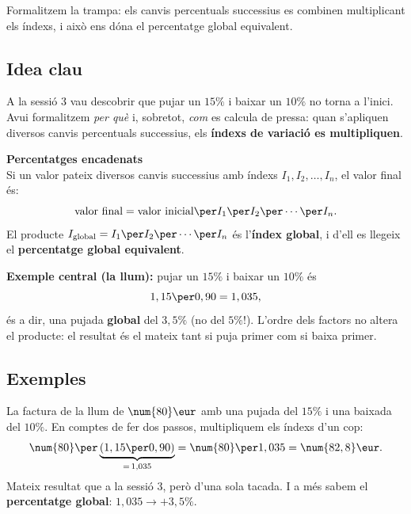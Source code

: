 %
{Formalitzem la trampa: els canvis percentuals successius es combinen multiplicant els índexs, i això ens dóna el percentatge global equivalent.}

\subsection{Idea clau}

A la sessió 3 vau descobrir que pujar un $15\%$ i baixar un $10\%$ no torna a l'inici.
Avui formalitzem \emph{per què} i, sobretot, \emph{com} es calcula de pressa: quan
s'apliquen diversos canvis percentuals successius, els \textbf{índexs de variació es
multipliquen}.

\begin{idea}
\textbf{Percentatges encadenats}\\
Si un valor pateix diversos canvis successius amb índexs $I_1, I_2, \dots, I_n$, el
valor final és:
\[
\text{valor final}=\text{valor inicial}\per I_1\per I_2\per\cdots\per I_n.
\]
El producte $I_{\text{global}}=I_1\per I_2\per\cdots\per I_n$ és l'\textbf{índex
global}, i d'ell es llegeix el \textbf{percentatge global equivalent}.
\smallskip

\textbf{Exemple central (la llum):} pujar un $15\%$ i baixar un $10\%$ és
\[
1,15\per 0,90=1,035,
\]
és a dir, una pujada \textbf{global} del $3,5\%$ (no del $5\%$!). L'ordre dels factors
no altera el producte: el resultat és el mateix tant si puja primer com si baixa
primer.
\end{idea}

\subsection{Exemples}

\begin{exemple}
La factura de la llum de $\num{80}\eur$ amb una pujada del $15\%$ i una baixada del
$10\%$. En comptes de fer dos passos, multipliquem els índexs d'un cop:
\[
\num{80}\per\underbrace{(1,15\per 0,90)}_{=\,1,035}=\num{80}\per 1,035=\num{82,8}\eur.
\]
Mateix resultat que a la sessió 3, però d'una sola tacada. I a més sabem el
\textbf{percentatge global}: $1,035\rightarrow +3,5\%$.
\end{exemple}

